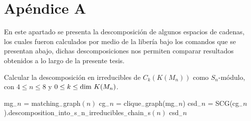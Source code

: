 \documentclass[12pt]{book}
\theoremstyle{definition}
\newcounter{in}
\begin{document}
%
%















\chapter{Apéndice A}
\label{Ap_A}


En este apartado se presenta la descomposición de algunos espacios de cadenas, los cuales fueron calculados por medio de la libería bajo los comandos que se presentan abajo, dichas descomposiciones nos permiten comparar resultados obtenidos a lo largo de la presente tesis.


\begin{algorithm}[H]
\caption{Calcular la descomposición en irreducibles de $C_{k}(K(M_n))$ como $S_n$-módulo, con $4 \leq n \leq 8$ y $0 \leq k \leq \textup{dim } K(M_{n})$.}
\begin{algorithmic}
\STATE mg$_{-}n$ = matching$_{-}$graph$(n)$
\STATE cg$_{-}n$ = clique$_{-}$graph(mg$_{-}n$)
\STATE csd$_{-}n$ = SCG(cg$_{-}n$).descomposition$_{-}$into$_{-}$s$_{-}$n$_{-}$irreducibles$_{-}$chain$_{-}$s$(n)$
\PRINT csd$_{-}n$
\ENDFOR
\end{algorithmic}
\end{algorithm}
\end{document}
